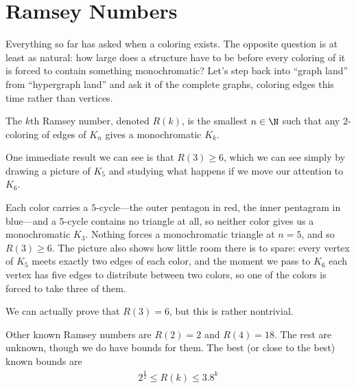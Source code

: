 \section{Ramsey Numbers}

Everything so far has asked when a coloring exists. The opposite question is at least as natural: how large does a structure have to be before every coloring of it is forced to contain something monochromatic? Let's step back into ``graph land'' from ``hypergraph land'' and ask it of the complete graphs, coloring edges this time rather than vertices.

\begin{boxdefinition}
    The $k$th Ramsey number, denoted $R(k)$, is the smallest $n \in \N$ such that any $2$-coloring of edges of $K_n$ gives a monochromatic $K_k$.
\end{boxdefinition}

One immediate result we can see is that $R(3) \geq 6$, which we can see simply by drawing a picture of $K_5$ and studying what happens if we move our attention to $K_6$.

\begin{figure}[H]
    \centering
\end{figure}

Each color carries a $5$-cycle---the outer pentagon in red, the inner pentagram in blue---and a $5$-cycle contains no triangle at all, so neither color gives us a monochromatic $K_3$. Nothing forces a monochromatic triangle at $n = 5$, and so $R(3) \geq 6$. The picture also shows how little room there is to spare: every vertex of $K_5$ meets exactly two edges of each color, and the moment we pass to $K_6$ each vertex has five edges to distribute between two colors, so one of the colors is forced to take three of them.

We can actually prove that $R(3) = 6$, but this is rather nontrivial.

Other known Ramsey numbers are $R(2) = 2$ and $R(4) = 18$. The rest are unknown, though we do have bounds for them. The best (or close to the best) known bounds are
\begin{align*}
    2^{\frac{k}{2}} \leq R(k) \leq 3.8^k
\end{align*}
